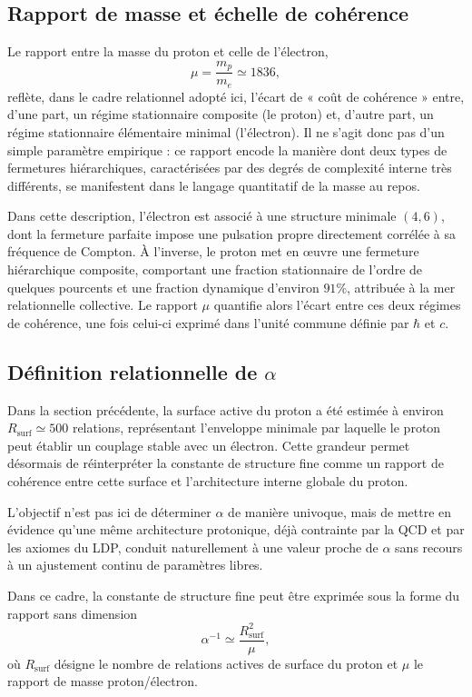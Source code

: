 \documentclass[11pt,a4paper]{article}
\begin{document}
\subsection{Rapport de masse et échelle de cohérence}

Le rapport entre la masse du proton et celle de l’électron,
\[
\mu = \frac{m_p}{m_e} \simeq 1836,
\]
reflète, dans le cadre relationnel adopté ici, l’écart de « coût de cohérence » entre, d’une part, un régime stationnaire composite (le proton) et, d’autre part, un régime stationnaire élémentaire minimal (l’électron). Il ne s’agit donc pas d’un simple paramètre empirique : ce rapport encode la manière dont deux types de fermetures hiérarchiques, caractérisées par des degrés de complexité interne très différents, se manifestent dans le langage quantitatif de la masse au repos.

Dans cette description, l’électron est associé à une structure minimale \(\left(4,6\right)\), dont la fermeture parfaite impose une pulsation propre directement corrélée à sa fréquence de Compton. À l’inverse, le proton met en œuvre une fermeture hiérarchique composite, comportant une fraction stationnaire de l’ordre de quelques pourcents et une fraction dynamique d’environ \(91\%\), attribuée à la mer relationnelle collective. Le rapport \(\mu\) quantifie alors l’écart entre ces deux régimes de cohérence, une fois celui-ci exprimé dans l’unité commune définie par \(\hbar\) et \(c\).

\subsection{Définition relationnelle de \texorpdfstring{\(\alpha\)}{alpha}}

Dans la section précédente, la surface active du proton a été estimée à environ \(R_{\mathrm{surf}} \simeq 500\) relations, représentant l’enveloppe minimale par laquelle le proton peut établir un couplage stable avec un électron. Cette grandeur permet désormais de réinterpréter la constante de structure fine comme un rapport de cohérence entre cette surface et l’architecture interne globale du proton.

L’objectif n’est pas ici de déterminer \(\alpha\) de manière univoque, mais de mettre en évidence qu’une même architecture protonique, déjà contrainte par la QCD et par les axiomes du LDP, conduit naturellement à une valeur proche de \(\alpha\) sans recours à un ajustement continu de paramètres libres.

Dans ce cadre, la constante de structure fine peut être exprimée sous la forme du rapport sans dimension
\[
\alpha^{-1} \simeq \frac{R_{\mathrm{surf}}^{2}}{\mu},
\]
où \(R_{\mathrm{surf}}\) désigne le nombre de relations actives de surface du proton et \(\mu\) le rapport de masse proton/électron.
\end{document}
